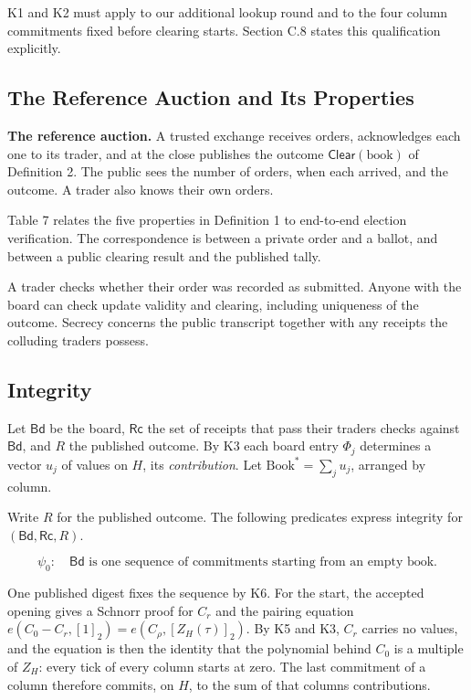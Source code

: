 K1 and K2 must apply to our additional lookup round and to the four column commitments fixed before clearing starts. Section C.8 states this qualification explicitly.

\subsection{The Reference Auction and Its Properties}

\textbf{The reference auction.} A trusted exchange receives orders, acknowledges each one to its trader, and at the close publishes the outcome \(\mathsf{Clear}(\text{book})\) of Definition 2. The public sees the number of orders, when each arrived, and the outcome. A trader also knows their own orders.

Table 7 relates the five properties in Definition 1 to end-to-end election verification. The correspondence is between a private order and a ballot, and between a public clearing result and the published tally.

A trader checks whether their order was recorded as submitted. Anyone with the board can check update validity and clearing, including uniqueness of the outcome. Secrecy concerns the public transcript together with any receipts the colluding traders possess.

\subsection{Integrity}

Let \(\mathsf{Bd}\) be the board, \(\mathsf{Rc}\) the set of receipts that pass their traders\textquotesingle{} checks against \(\mathsf{Bd}\), and \(R\) the published outcome. By K3 each board entry \(\Phi_j\) determines a vector \(u_j\) of values on \(H\), its \emph{contribution}. Let \(\text{Book}^* = \sum_j u_j\), arranged by column.

Write \(R\) for the published outcome. The following predicates express integrity for \((\mathsf{Bd},\mathsf{Rc},R)\).

\[\psi_0:\quad \mathsf{Bd} \text{ is one sequence of commitments starting from an empty book.}\]

One published digest fixes the sequence by K6. For the start, the accepted opening gives a Schnorr proof for \(C_r\) and the pairing equation \(e(C_0 - C_r, [1]_2) = e(C_\rho, [Z_H(\tau)]_2)\). By K5 and K3, \(C_r\) carries no values, and the equation is then the identity that the polynomial behind \(C_0\) is a multiple of \(Z_H\): every tick of every column starts at zero. The last commitment of a column therefore commits, on \(H\), to the sum of that column\textquotesingle s contributions.

